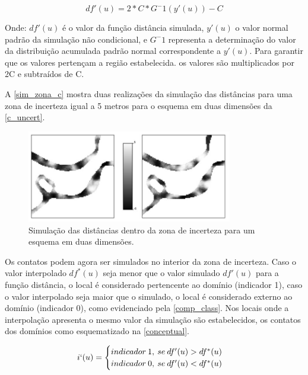 \begin{equation}
\label{sim_trans}
    df'(u)=2*C*G^-1(y'(u))-C
\end{equation}

Onde: $df'(u)$ é o valor da função distância simulada, $y'(u)$ o valor normal padrão da simulação não condicional, e $G^-1$ representa a determinação do valor da distribuição acumulada padrão normal correspondente a $y'(u)$. Para garantir que os valores pertençam a região estabelecida. os valores são multiplicados por 2C e subtraídos de C.

A \autoref{sim_zona_c} mostra duas realizações da simulação das distâncias para uma zona de incerteza igual a 5 metros para o esquema em duas dimensões da \autoref{c_uncert}.

\begin{figure}[H]
	\caption{\label{sim_zona_c}Simulação das distâncias dentro da zona de incerteza para um esquema em duas dimensões.}
	\centering
		\includegraphics[width=0.8\textwidth]{capitulo_2/imagens/sim_zona_c.png}
\end{figure}

Os contatos podem agora ser simulados no interior da zona de incerteza. Caso o valor interpolado $df^{*}(u)$ seja menor que o valor simulado $df'(u)$ para a função distância, o local é considerado pertencente ao domínio (indicador 1), caso o valor interpolado seja maior que o simulado, o local é considerado externo ao domínio (indicador 0), como evidenciado pela \autoref{comp_class}. Nos locais onde a interpolação apresenta o mesmo valor da simulação são estabelecidos, os contatos dos domínios como esquematizado na \autoref{conceptual}.

\begin{equation}
\label{comp_class}
	i`(u)=\begin{cases}
	indicador \: 1, \: se \: df'(u) > df^{*}(u)\\
	indicador \: 0, \: se \: df'(u) < df^{*}(u)\end{cases}
\end{equation}

